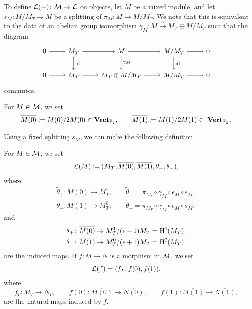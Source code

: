 To define ${\mathcal L}(-)\colon {\mathcal M} \rightarrow {\mathcal L}$ on objects, let $M$ be a mixed module, and let $s_M \colon M / M_T \rightarrow M$ be a splitting of $\pi_M \colon M \rightarrow M / M_T$. We note that this is equivalent to the data of an abelian group isomorphism $\gamma_M \colon M \xrightarrow{\sim} M_T \oplus M / M_T$ such that the diagram
\[\begin{tikzcd}
	0 & {M_T} & M & {M / M_T} & 0 \\
	0 & {M_T} & {M_T \oplus M / M_T} & {M / M_T} & 0
	\arrow[from=1-1, to=1-2]
	\arrow[from=1-2, to=1-3]
	\arrow["\id", from=1-2, to=2-2]
	\arrow[from=1-3, to=1-4]
	\arrow[from=1-4, to=1-5]
	\arrow["\gamma_M", from=1-3, to=2-3]
	\arrow["\id", from=1-4, to=2-4]
	\arrow[from=2-1, to=2-2]
	\arrow[from=2-2, to=2-3]
	\arrow[from=2-3, to=2-4]
	\arrow[from=2-4, to=2-5]
\end{tikzcd}\]
commutes.

\begin{defn}
  For $M \in {\mathcal M}$, we set
  \[
  \overline{M(0)} \coloneqq M(0) / 2 M(0) \in \operatorname{\mathbf{Vect}}_{{\mathbb F}_2}, \qquad \overline{M(1)} \coloneqq M(1) / 2 M(1) \in~\operatorname{\mathbf{Vect}}_{{\mathbb F}_2}.
  \]
\end{defn}

Using a fixed splitting $s_M$, we can make the following definition.

\begin{defn}
  For $M \in {\mathcal M}$, we set
  \[
  {\mathcal L}(M) \coloneqq (M_T, \overline{M(0)}, \overline{M(1)}, \theta_+, \theta_-),
  \]
  where
  \begin{align*}
    \widetilde{\theta}_+ \colon M(0) \rightarrow M_T^1, \qquad \widetilde{\theta}_+ = \pi_{M_T} \circ \gamma_M \circ \epsilon_M \circ s_M, \\
    \widetilde{\theta}_- \colon M(1) \rightarrow M_T^0, \qquad \widetilde{\theta}_- = \pi_{M_T} \circ \gamma_M \circ \epsilon_M \circ s_M,
  \end{align*}
  and
  \begin{align*}
    \theta_+ \colon \overline{M(0)} \rightarrow M_T^1 / (\epsilon - 1)M_T = \mathrm{H}^1(M_T), \\
    \theta_- \colon \overline{M(1)} \rightarrow M_T^0 / (\epsilon + 1)M_T = \mathrm{H}^2(M_T),
  \end{align*}
  are the induced maps. If $f \colon M \rightarrow N$ is a morphism in ${\mathcal M}$, we set
  \[
  {\mathcal L}(f) = (f_T, f(0), f(1)),
  \]
  where
  \[
    f_T \colon M_T \rightarrow N_T, \qquad
    f(0) \colon \overline{M(0)} \rightarrow \overline{N(0)}, \qquad
    f(1) \colon \overline{M(1)} \rightarrow \overline{N(1)},
  \]
  are the natural maps induced by $f$.
\end{defn}

